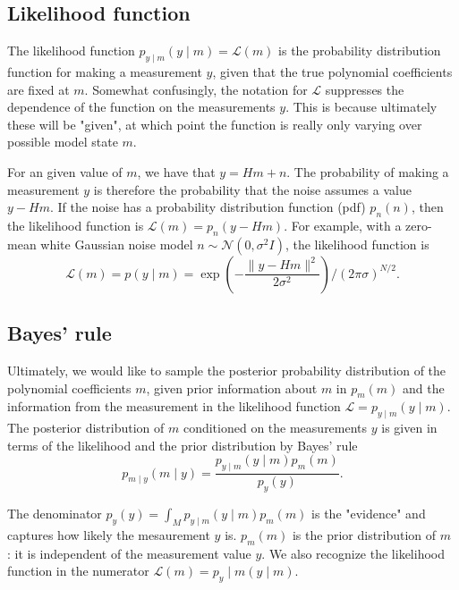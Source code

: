 \documentclass[11pt]{article}
\begin{document}
\subsection{Likelihood function}

The likelihood function $p_{y \mid m}(y \mid m)=\mathcal{L}(m)$ is the probability distribution function for making a measurement $y$, given that the true polynomial coefficients are fixed at $m$. Somewhat confusingly,
the notation for $\mathcal{L}$ suppresses the dependence of the function on the measurements $y$. This is because ultimately these will be "given", at which point the function is really only varying over possible model state $m$.

For an given value of $m$, we have that $y=H m+n$. The probability of making a measurement $y$ is therefore the probability that the noise assumes a value $y-H m$. If the noise has a probability distribution function (pdf) $p_{n}(n)$, then the likelihood function is $\mathcal{L}(m)=p_{n}(y-H m)$. For example, with a zero-mean white Gaussian noise model $n \sim \mathcal{N}\left(0, \sigma^{2} I\right)$, the likelihood function is
\begin{equation}
\mathcal{L}(m)=p(y \mid m)=\exp \left(-\frac{\|y-H m\|^{2}}{2 \sigma^{2}}\right) /(2 \pi \sigma)^{N / 2} .
\end{equation}

\subsection{Bayes' rule}

Ultimately, we would like to sample the posterior probability distribution of the polynomial coefficients $m$, given prior information about $m$ in $p_{m}(m)$ and the information from the measurement in the likelihood function $\mathcal{L}=p_{y \mid m}(y \mid m)$. The posterior distribution of $m$ conditioned on the measurements $y$ is given in terms of the likelihood and the prior distribution by Bayes' rule
\begin{equation}
p_{m \mid y}(m \mid y)=\frac{p_{y \mid m}(y \mid m) p_{m}(m)}{p_{y}(y)} .
\end{equation}

The denominator $p_{y}(y)=\int_{M} p_{y \mid m}(y \mid m) p_{m}(m)$ is the "evidence" and captures how likely the mesaurement $y$ is. $p_{m}(m)$ is the prior distribution of $m$ : it is independent of the measurement value $y$. We also recognize the likelihood function in the numerator $\mathcal{L}(m)=p_{y} \mid m(y \mid m)$.
\end{document}
